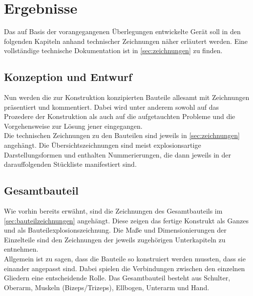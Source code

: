 \chapter{Ergebnisse}
	Das auf Basis der vorangegangenen Überlegungen entwickelte Gerät soll in den folgenden Kapiteln anhand technischer Zeichnungen näher erläutert werden.
	Eine vollständige technische Dokumentation ist in \cref{sec:zeichnungen} zu finden.
	\section{Konzeption und Entwurf}
		Nun werden die zur Konstruktion konzipierten Bauteile allesamt mit Zeichnungen präsentiert und kommentiert.
		Dabei wird unter anderem sowohl auf das Prozedere der Konstruktion als auch auf die aufgetauchten Probleme und die Vorgehensweise zur Lösung jener eingegangen.\\
		Die technischen Zeichnungen zu den Bauteilen sind jeweils in \cref{sec:zeichnungen} angehängt.
		Die Übersichtszeichnungen sind meist explosionsartige Darstellungsformen und enthalten Nummerierungen, die dann jeweils in der darauffolgenden Stückliste manifestiert sind.
		
	\section{Gesamtbauteil}
		Wie vorhin bereits erwähnt, sind die Zeichnungen des Gesamtbauteils im \cref{sec:bauteilzeichnungen} angehängt.
		Diese zeigen das fertige Konstrukt als Ganzes und als Bauteilexplosionszeichnung.
		Die Maße und Dimensionierungen der Einzelteile sind den Zeichnungen der jeweils zugehörigen Unterkapiteln zu entnehmen.\\
		Allgemein ist zu sagen, dass die Bauteile so konstruiert werden mussten, dass sie einander angepasst sind.
		Dabei spielen die Verbindungen zwischen den einzelnen Gliedern eine entscheidende Rolle.
		Das Gesamtbauteil besteht aus Schulter, Oberarm, Muskeln (Bizeps/Trizeps), Ellbogen, Unterarm und Hand.
	
